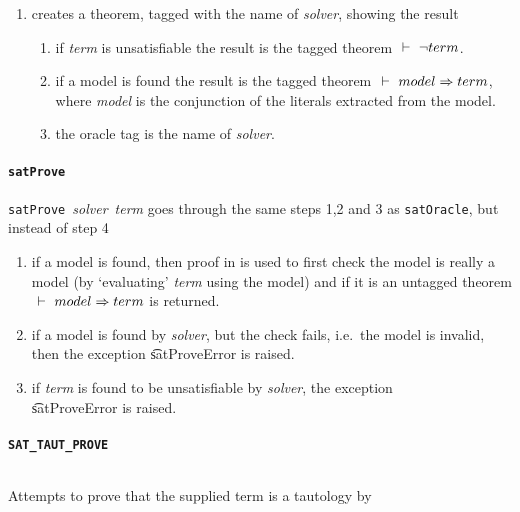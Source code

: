 \begin{enumerate}
\item creates a theorem, tagged with the name of {\it solver}, showing the result

\begin{enumerate}

\item if {\it term} is unsatisfiable the result is the tagged theorem $\ \vdash\  \neg term$.
\item if a model is found the result is the tagged theorem $\ \vdash\  model \Rightarrow term$,
where {\it model} is the conjunction of the literals extracted from the model.
\item the oracle tag is the name of {\it solver}.
\end{enumerate}
\end{enumerate}

\paragraph{\tt satProve}${}$\\
{\small{\tt satProve}~{\it solver}~{\it term}} goes through the same steps 1,2 and 3 
as {\tt satOracle}, but instead of step 4

\begin{enumerate}
\item  if a model is found, then proof in \HOL{} is used to first check the model
is really a model (by `evaluating' {\it term} using the model) and if it
is an untagged theorem $\ \vdash\  model \Rightarrow term$ is returned.

\item if a model is found by {\it solver}, but the \HOL{} check fails, 
i.e.~the model is invalid, then the exception \t{satProveError} is raised.

\item if {\it term} is found to be unsatisfiable by {\it solver},
the exception \\ \t{satProveError} is raised.

\end{enumerate}

\paragraph{\tt SAT\_TAUT\_PROVE}${}$\\

Attempts to prove that the supplied term is a tautology by


